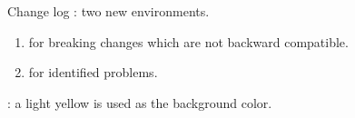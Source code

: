 \documentclass[12pt, a4paper]{article}
\begin{document}
\begin{tdocnew}
	\item Change log : two new environments.
    \begin{enumerate}
        \item {} for breaking changes which are not backward compatible.

        \item {} for identified problems.
    \end{enumerate}

	\item {}: a light yellow is used as the background color.
\end{tdocnew}
\end{document}
